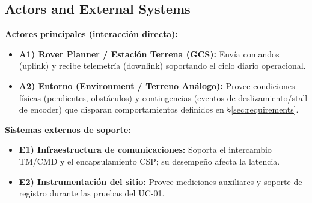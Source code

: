 \subsection{Actors and External Systems}\label{subsec:actors_systems}

\textbf{Actores principales (interacción directa):}
\begin{itemize}
    \item \textbf{A1) Rover Planner / Estación Terrena (GCS):} Envía comandos (uplink) y recibe telemetría (downlink) soportando el ciclo diario operacional.
    \item \textbf{A2) Entorno (Environment / Terreno Análogo):} Provee condiciones físicas (pendientes, obstáculos) y contingencias (eventos de deslizamiento/stall de encoder) que disparan comportamientos definidos en \S\ref{sec:requirements}.
\end{itemize}

\textbf{Sistemas externos de soporte:}
\begin{itemize}
    \item \textbf{E1) Infraestructura de comunicaciones:} Soporta el intercambio TM/CMD y el encapsulamiento CSP; su desempeño afecta la latencia.
    \item \textbf{E2) Instrumentación del sitio:} Provee mediciones auxiliares y soporte de registro durante las pruebas del UC‑01.
\end{itemize}
